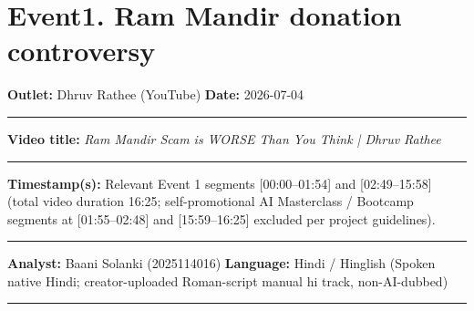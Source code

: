\documentclass[10pt,a4paper]{article}
\newcommand{\formrule}{\par\vspace{3pt}\noindent\rule{\textwidth}{0.35pt}\par\vspace{7pt}}
\newcommand{\sectionrule}{\par\vspace{4pt}\noindent\rule{\textwidth}{0.4pt}\par\vspace{8pt}}
\begin{document}
\vspace{4pt}

\newpage


\section*{Event1. Ram Mandir donation controversy}
\par\vspace{6pt}
\noindent\textbf{Outlet:} Dhruv Rathee (YouTube) \hfill \textbf{Date:} 2026-07-04
\formrule
\noindent\textbf{Video title:} \emph{Ram Mandir Scam is WORSE Than You Think | Dhruv Rathee}
\formrule
\noindent\textbf{Timestamp(s):} Relevant Event 1 segments [00:00--01:54] and [02:49--15:58] (total video duration 16:25; self-promotional AI Masterclass / Bootcamp segments at [01:55--02:48] and [15:59--16:25] excluded per project guidelines).
\formrule
\noindent\textbf{Analyst:} Baani Solanki (2025114016) \hfill \textbf{Language:} Hindi / Hinglish (Spoken native Hindi; creator-uploaded Roman-script manual hi track, non-AI-dubbed)
\sectionrule
\end{document}
